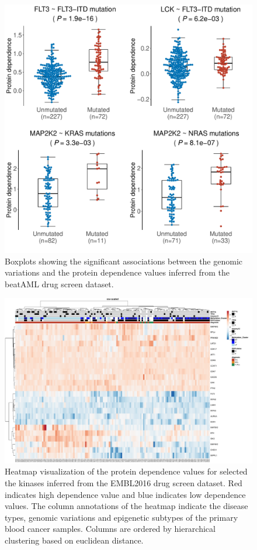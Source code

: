 \documentclass{scrartcl}
\begin{document}
\begin{figure}[h]
    \centering
    \includegraphics[width=15cm]{beatAML_geneAssociations-1}
    \caption{Boxplots showing the significant associations between the genomic variations and the protein dependence values inferred from the beatAML drug screen dataset.}
    
\end{figure}

\begin{figure}[h]
    \centering
    \includegraphics[width=16cm]{EMBL_coefHeatmap-1}
    \caption{Heatmap visualization of the protein dependence values for selected the kinases inferred from the EMBL2016 drug screen dataset. Red indicates high dependence value and blue indicates low dependence values. The column annotations of the heatmap indicate the disease types, genomic variations and epigenetic subtypes of the primary blood cancer samples. Columns are ordered by hierarchical clustering based on euclidean distance.}
\end{figure}
\end{document}
